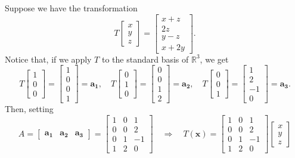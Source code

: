 \documentclass[20pt,a4paper]{extarticle}
\begin{document}
	Suppose we have the transformation
		\[
			T \begin{bmatrix} x \\ y \\ z \end{bmatrix} =  \begin{bmatrix} x + z \\ 2z \\ y - z\\  x + 2y \end{bmatrix}.
		\]
	Notice that, if we apply $T$ to the standard basis of $\mathbb{R}^3$, we get
		\[
			T \begin{bmatrix} 1 \\ 0 \\ 0 \end{bmatrix} = \begin{bmatrix} 1 \\ 0 \\ 0 \\ 1 \end{bmatrix} = \mathbf{a_1} , \quad T \begin{bmatrix} 0 \\ 1 \\ 0 \end{bmatrix} = \begin{bmatrix} 0 \\ 0 \\ 1 \\ 2 \end{bmatrix} = \mathbf{a_2} , \quad T \begin{bmatrix} 0 \\ 0 \\ 1 \end{bmatrix} = \begin{bmatrix} 1 \\ 2 \\ -1 \\ 0 \end{bmatrix} = \mathbf{a_3} .
		\]
	Then, setting
		\[
			 A = \begin{bmatrix} \mathbf{a_1} & \mathbf{a_2} & \mathbf{a_3} \end{bmatrix} = \begin{bmatrix} 1 & 0 & 1 \\ 0 & 0 & 2 \\ 0 & 1 & -1 \\ 1 & 2 & 0 \end{bmatrix} \quad \Rightarrow \quad T (\mathbf{x}) = \begin{bmatrix} 1 & 0 & 1 \\ 0 & 0 & 2 \\ 0 & 1 & -1 \\ 1 & 2 & 0 \end{bmatrix} \begin{bmatrix} x \\ y \\ z \end{bmatrix}
		\]
\end{document}
